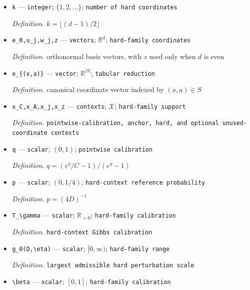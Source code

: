\documentclass{article}
\begin{document}
\begin{itemize}
  \item \texttt{k} --- \texttt{integer}; \(\{1,2,\ldots\}\); \texttt{number of hard coordinates}
  \par\smallskip\noindent\emph{Definition.} \(k=\lfloor(d-1)/2\rfloor\)
  \item \texttt{e\_\allowbreak{}0,\allowbreak{}u\_\allowbreak{}j,\allowbreak{}w\_\allowbreak{}j,\allowbreak{}z} --- \texttt{vectors}; \(\mathbb R^d\); \texttt{hard-\allowbreak{}family coordinates}
  \par\smallskip\noindent\emph{Definition.} orthonormal basis vectors, with \(z\) used only when \(d\) is even
  \item \texttt{e\_\allowbreak{}\{(x,\allowbreak{}a)\}\allowbreak{}} --- \texttt{vector}; \(\mathbb R^{|S|}\); \texttt{tabular reduction}
  \par\smallskip\noindent\emph{Definition.} canonical coordinate vector indexed by \((x,a)\in S\)
  \item \texttt{x\_\allowbreak{}C,\allowbreak{}x\_\allowbreak{}A,\allowbreak{}x\_\allowbreak{}j,\allowbreak{}x\_\allowbreak{}z} --- \texttt{contexts}; \(\mathcal X\); \texttt{hard-\allowbreak{}family support}
  \par\smallskip\noindent\emph{Definition.} \texttt{pointwise-\allowbreak{}calibration,\allowbreak{} anchor,\allowbreak{} hard,\allowbreak{} and optional unused-\allowbreak{}coordinate contexts}
  \item \texttt{q} --- \texttt{scalar}; \((0,1)\); \texttt{pointwise calibration}
  \par\smallskip\noindent\emph{Definition.} \(q=(e^\eta/C-1)/(e^\eta-1)\)
  \item \texttt{p} --- \texttt{scalar}; \((0,1/4)\); \texttt{hard-\allowbreak{}context reference probability}
  \par\smallskip\noindent\emph{Definition.} \(p=(4D)^{-1}\)
  \item \texttt{T\_\allowbreak{}\textbackslash{}\allowbreak{}gamma} --- \texttt{scalar}; \(\mathbb R_{>0}\); \texttt{hard-\allowbreak{}family calibration}
  \par\smallskip\noindent\emph{Definition.} \texttt{hard-\allowbreak{}context Gibbs calibration}
  \item \texttt{g\_\allowbreak{}0(D,\allowbreak{}\textbackslash{}\allowbreak{}eta)} --- \texttt{scalar}; \([0,\infty)\); \texttt{hard-\allowbreak{}family range}
  \par\smallskip\noindent\emph{Definition.} \texttt{largest admissible hard perturbation scale}
  \item \texttt{\textbackslash{}\allowbreak{}beta} --- \texttt{scalar}; \([0,1]\); \texttt{hard-\allowbreak{}family calibration}

\end{itemize}
\end{document}

